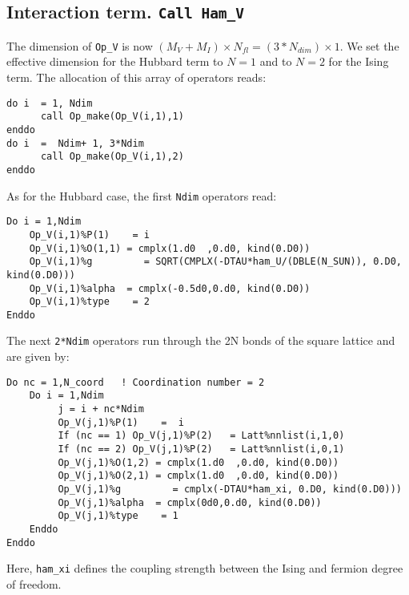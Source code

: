 \subsection{Interaction term. \texttt{Call Ham\_V}}
The dimension of   \texttt{Op\_V}  is now  $(M_V + M_I)\times N_{fl}=(3*N_{dim}) \times 1$. 
We set the effective dimension  for the Hubbard term to  $N=1$  and to  $N=2$ for the Ising term. The allocation of this array of operators reads: 
\begin{verbatim}
do i  = 1, Ndim
      call Op_make(Op_V(i,1),1)
enddo
do i  =  Ndim+ 1, 3*Ndim
      call Op_make(Op_V(i,1),2)
enddo
\end{verbatim}
As for the Hubbard case, the first \texttt{Ndim}  operators read: 
\begin{verbatim}
Do i = 1,Ndim
    Op_V(i,1)%P(1)    = i
    Op_V(i,1)%O(1,1) = cmplx(1.d0  ,0.d0, kind(0.D0))
    Op_V(i,1)%g         = SQRT(CMPLX(-DTAU*ham_U/(DBLE(N_SUN)), 0.D0, kind(0.D0)))
    Op_V(i,1)%alpha  = cmplx(-0.5d0,0.d0, kind(0.D0))
    Op_V(i,1)%type    = 2
Enddo
\end{verbatim}
The  next \texttt{2*Ndim} operators run through the 2N bonds of the square lattice and   are given by:
\begin{verbatim}
Do nc = 1,N_coord   ! Coordination number = 2
    Do i = 1,Ndim
         j = i + nc*Ndim
         Op_V(j,1)%P(1)    =  i 
         If (nc == 1) Op_V(j,1)%P(2)   = Latt%nnlist(i,1,0)
         If (nc == 2) Op_V(j,1)%P(2)   = Latt%nnlist(i,0,1)
         Op_V(j,1)%O(1,2) = cmplx(1.d0  ,0.d0, kind(0.D0))
         Op_V(j,1)%O(2,1) = cmplx(1.d0  ,0.d0, kind(0.D0))
         Op_V(j,1)%g         = cmplx(-DTAU*ham_xi, 0.D0, kind(0.D0)))
         Op_V(j,1)%alpha  = cmplx(0d0,0.d0, kind(0.D0))
         Op_V(j,1)%type    = 1
    Enddo
Enddo
\end{verbatim}
Here,  \texttt{ham\_xi} defines the coupling strength  between the Ising  and fermion degree of freedom.

